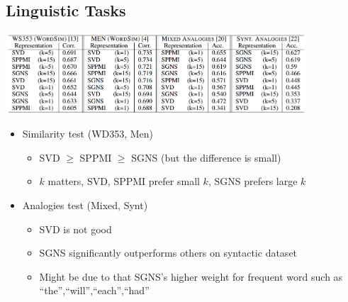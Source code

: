 \documentclass[compress]{beamer}
\begin{document}
\subsection{Linguistic Tasks}
\begin{frame}{\subsecname}
    \includegraphics[height=3cm,width=\textwidth]{exp.png}
    \begin{itemize}
        \item Similarity test (WD353, Men)
        \begin{itemize}
            \item SVD $\ge$ SPPMI $\ge$ SGNS (but the difference is small)
            \item $k$ matters, SVD, SPPMI prefer small $k$, SGNS prefers large $k$
        \end{itemize}
        \item Analogies test (Mixed, Synt)
        \begin{itemize}
            \item SVD is not good
            \item SGNS significantly outperforms others on syntactic dataset
            \item Might be due to that SGNS's higher weight for frequent word such as ``the'',``will'',``each'',``had''
        \end{itemize}
    \end{itemize}
\end{frame}
\end{document}
